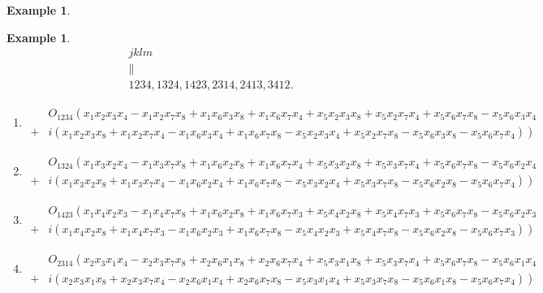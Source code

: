 \documentclass[aps,preprint]{revtex4}%
\newtheorem{example}[theorem]{Example}
\begin{document}
\begin{example}
\begin{enumerate}
\end{enumerate}
\end{example}

\begin{example}%
\begin{gather}
jklm\\
\parallel\\
1234,1324,1423,2314,2413,3412.
\end{gather}


\begin{enumerate}
\item
\begin{align}
&  O_{1234}\left(  \overset{}{x_{1}x_{2}x_{3}x_{4}-x_{1}x_{2}x_{7}x_{8}%
+x_{1}x_{6}x_{3}x_{8}+x_{1}x_{6}x_{7}x_{4}+x_{5}x_{2}x_{3}x_{8}+x_{5}%
x_{2}x_{7}x_{4}+x_{5}x_{6}x_{7}x_{8}-x_{5}x_{6}x_{3}x_{4}}\right. \\
+  &  \left.  i\left(  \overset{}{x_{1}x_{2}x_{3}x_{8}+x_{1}x_{2}x_{7}%
x_{4}-x_{1}x_{6}x_{3}x_{4}+x_{1}x_{6}x_{7}x_{8}-x_{5}x_{2}x_{3}x_{4}%
+x_{5}x_{2}x_{7}x_{8}-x_{5}x_{6}x_{3}x_{8}-x_{5}x_{6}x_{7}x_{4}}\right)
\right)
\end{align}


\item
\begin{align}
&  O_{1324}\left(  \overset{}{x_{1}x_{3}x_{2}x_{4}-x_{1}x_{3}x_{7}x_{8}%
+x_{1}x_{6}x_{2}x_{8}+x_{1}x_{6}x_{7}x_{4}+x_{5}x_{3}x_{2}x_{8}+x_{5}%
x_{3}x_{7}x_{4}+x_{5}x_{6}x_{7}x_{8}-x_{5}x_{6}x_{2}x_{4}}\right. \\
+  &  \left.  i\left(  \overset{}{x_{1}x_{3}x_{2}x_{8}+x_{1}x_{3}x_{7}%
x_{4}-x_{1}x_{6}x_{2}x_{4}+x_{1}x_{6}x_{7}x_{8}-x_{5}x_{3}x_{2}x_{4}%
+x_{5}x_{3}x_{7}x_{8}-x_{5}x_{6}x_{2}x_{8}-x_{5}x_{6}x_{7}x_{4}}\right)
\right)
\end{align}


\item
\begin{align}
&  O_{1423}\left(  \overset{}{x_{1}x_{4}x_{2}x_{3}-x_{1}x_{4}x_{7}x_{8}%
+x_{1}x_{6}x_{2}x_{8}+x_{1}x_{6}x_{7}x_{3}+x_{5}x_{4}x_{2}x_{8}+x_{5}%
x_{4}x_{7}x_{3}+x_{5}x_{6}x_{7}x_{8}-x_{5}x_{6}x_{2}x_{3}}\right. \\
+  &  \left.  i\left(  \overset{}{x_{1}x_{4}x_{2}x_{8}+x_{1}x_{4}x_{7}%
x_{3}-x_{1}x_{6}x_{2}x_{3}+x_{1}x_{6}x_{7}x_{8}-x_{5}x_{4}x_{2}x_{3}%
+x_{5}x_{4}x_{7}x_{8}-x_{5}x_{6}x_{2}x_{8}-x_{5}x_{6}x_{7}x_{3}}\right)
\right)
\end{align}


\item
\begin{align}
&  O_{2314}\left(  \overset{}{x_{2}x_{3}x_{1}x_{4}-x_{2}x_{3}x_{7}x_{8}%
+x_{2}x_{6}x_{1}x_{8}+x_{2}x_{6}x_{7}x_{4}+x_{5}x_{3}x_{1}x_{8}+x_{5}%
x_{3}x_{7}x_{4}+x_{5}x_{6}x_{7}x_{8}-x_{5}x_{6}x_{1}x_{4}}\right. \\
+  &  \left.  i\left(  \overset{}{x_{2}x_{3}x_{1}x_{8}+x_{2}x_{3}x_{7}%
x_{4}-x_{2}x_{6}x_{1}x_{4}+x_{2}x_{6}x_{7}x_{8}-x_{5}x_{3}x_{1}x_{4}%
+x_{5}x_{3}x_{7}x_{8}-x_{5}x_{6}x_{1}x_{8}-x_{5}x_{6}x_{7}x_{4}}\right)
\right)
\end{align}



\end{enumerate}
\end{example}
\end{document}
